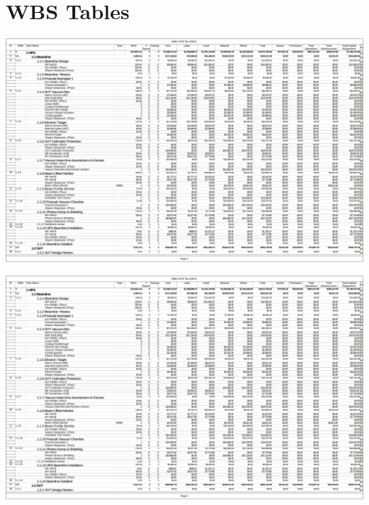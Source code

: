 \appendix
\renewcommand*{\thesubsection}{\thesection.\arabic{subsection}}
\renewcommand*{\thesubsubsection}{\thesubsection.\arabic{subsubsection}}

\section{WBS Tables}
\label{sec:wbs}
% 
\begin{center}
\includegraphics[page=1,angle=90,height=0.9\textheight]{cost_schedule/HPSV470.pdf} 
\end{center}

\begin{center}
\includegraphics[page=2,angle=90,height=\textheight]{cost_schedule/HPSV470.pdf} 
\end{center}

